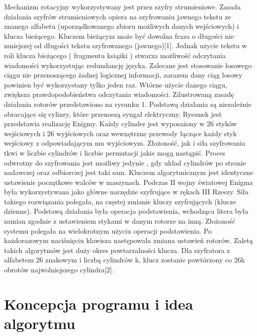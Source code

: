 \documentclass[11pt,a4paper,polish]{article}
\begin{document}
Mechanizm rotacyjny wykorzystywany jest przez szyfry strumieniowe. Zasada
działania szyfrów strumieniowych opiera na szyfrowaniu jawnego tekstu ze 
znanego alfabetu (uporządkowanego zbioru możliwych danych wejściowych) i klucza
bieżącego. Kluczem bieżącym może być dowolna fraza o długości nie mniejszej
od długości tekstu szyfrowanego (jawnego)[1]. Jednak użycie tekstu w roli klucza bieżącego ( fragmentu książki ) stwarza możliwość odczytania wiadomości
wykorzystując redundancję języka. Zalecane jest stosowanie losowego ciągu nie
przenoszącego żadnej logicznej informacji, zarazem dany ciąg losowy powinien
być wykorzystany tylko jeden raz. Wtórne użycie danego ciągu, zwiększa prawdopodobieństwa odczytania wiadomości.
Zilustrowaną zasadę działania rotorów przedstawiono na rysunku 1. Podstawą
działania są niezależnie obracające się cylinry, które przenoszą syngał elektryczny. Rysunek jest przedstawia realizację Enigmy. Każdy cylinder jest wyposażony
w 26 styków wejściowych i 26 wyjściowych oraz wewnętrzne przewody łączące
każdy styk wejściowy z odpowiadającym mu wyjściowym. Złożoność, jak i siła
szyfrowania tkwi w liczbie cylindrów i liczbie permutacji jakie mogą nastąpić.
Proces odwrotny do szyfrowania jest możliwy jedynie , gdy układ cylindrów
po stronie nadawczej oraz odbiorczej jest taki sam. Kluczem algorytmicznym
jest identyczne ustawienie początkowe walców w maszynach. Podczas II wojny światowej Enigma była wykorzystywana jako główne narzędzie szyfrujące w
rękach III Rzeszy. Siła takiego rozwiązania polegała, na częstej zmianie kluczy
szyfrujących (klucze dzienne). Podstawą działania była operacja podstawienia,
wchodząca litera była zamian zgodnie z ustawieniem stykami w danym rotorze
na inną. Złożoność systemu polegała na wielokrotnym użyciu operacji podstawienia. Po każdorazowym naciśnięciu klawisza następowała zmiana ustawień
rotorów.
Zaletą takich algorytmów jest duży okres powtarzalności klucza. Dla szyfratora
z alfabetem 26 znakowym i liczbą cylindrów k, klucz zostanie powtórzony co
26k obrotów najwolniejszego cylindra[2].


\section{Koncepcja programu i idea algorytmu}

\end{document}

